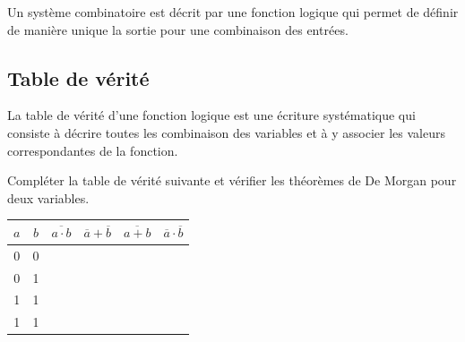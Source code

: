Un système combinatoire est décrit par une fonction logique qui permet de définir de manière unique la sortie pour une combinaison des entrées. 

\subsection{Table de vérité}
La table de vérité d'une fonction logique est une écriture systématique qui consiste à décrire toutes les combinaison des variables et à y associer les valeurs correspondantes de la fonction. 

\begin{exemple}


Compléter la table de vérité suivante et vérifier les théorèmes de De Morgan pour deux variables.
\begin{center}
\begin{tabular}[c]{|c|c||c|c|c|c|}
\hline
$a$ & $b$ & $\overline{a\cdot b}$ & $\overline{a} + \overline{b}$ & $\overline{a+b}$ & $\overline{a}\cdot\overline{b}$ \\
\hline \hline 
0 & 0 & & & & \\ \hline
0 & 1 & & & & \\ \hline
1 & 1 & & & & \\ \hline
1 & 1 & & & & \\ \hline
\end{tabular}
\end{center}

\end{exemple}

